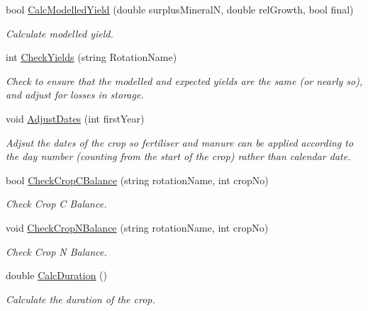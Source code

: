 \begin{DoxyCompactItemize}
bool \mbox{\hyperlink{class_crop_class_a583fd6d85ee5f428aebe026f8c5ae3bf}{Calc\+Modelled\+Yield}} (double surplus\+MineralN, double rel\+Growth, bool final)
\begin{DoxyCompactList}\small\item\em Calculate modelled yield. \end{DoxyCompactList}\item 
int \mbox{\hyperlink{class_crop_class_aa028ed077f192692e18046792688e625}{Check\+Yields}} (string Rotation\+Name)
\begin{DoxyCompactList}\small\item\em Check to ensure that the modelled and expected yields are the same (or nearly so), and adjust for losses in storage. \end{DoxyCompactList}\item 
void \mbox{\hyperlink{class_crop_class_a78b34023e52dca49077073e7191727b1}{Adjust\+Dates}} (int first\+Year)
\begin{DoxyCompactList}\small\item\em Adjsut the dates of the crop so fertiliser and manure can be applied according to the day number (counting from the start of the crop) rather than calendar date. \end{DoxyCompactList}\item 
bool \mbox{\hyperlink{class_crop_class_adaf339a54eea1a6f2682cefde6a68f01}{Check\+Crop\+C\+Balance}} (string rotation\+Name, int crop\+No)
\begin{DoxyCompactList}\small\item\em Check Crop C Balance. \end{DoxyCompactList}\item 
void \mbox{\hyperlink{class_crop_class_a46553cb55d0d0226d8466727d9cc13a1}{Check\+Crop\+N\+Balance}} (string rotation\+Name, int crop\+No)
\begin{DoxyCompactList}\small\item\em Check Crop N Balance. \end{DoxyCompactList}\item 
double \mbox{\hyperlink{class_crop_class_a53b9157a06bc1572e964e8edb6088a0f}{Calc\+Duration}} ()
\begin{DoxyCompactList}\small\item\em Calculate the duration of the crop. \end{DoxyCompactList}\item 
\mbox{\label{class_crop_class_adcbe888b5ffd4a000e7d45daece3fe84}} 

\end{DoxyCompactItemize}
